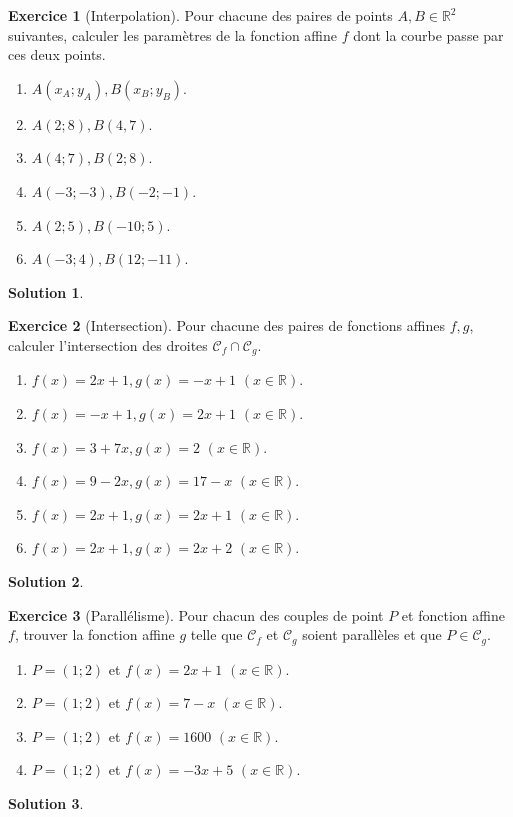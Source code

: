 \documentclass[12pt]{paper}
\theoremstyle{plain}
\newtheorem*{sol}{Solution}
\theoremstyle{definition}
\newtheorem{ex}{Exercice}
\newcommand{\C}{\mathcal{C}}
\newcommand{\R}{\mathbb{R}}
\newif\ifsolutions
\newcommand{\exe}[2]{
		\begin{ex} #1  \end{ex}
		\begin{sol} #2 \end{sol}
	}
\newcommand{\exe}[2]{
		\begin{ex} #1  \end{ex}
	}
\begin{document}
\pagestyle{fancy}
\fancyhead[C]{\textbf{Fonctions affines 2 \ifsolutions -- Solutions \fi}}
\fancyhead[R]{\today}

\exe{[Interpolation]
	Pour chacune des paires de points $A,B \in \R^2$ suivantes, calculer les paramètres de la fonction affine $f$ dont la courbe passe par ces deux points.
	
	\begin{multicols}{2}
	\begin{enumerate}
		\item $A(x_A;y_A), B(x_B; y_B)$.
		\item $A(2;8), B(4,7)$.
		\item $A(4;7), B(2;8)$.
		\item $A(-3; -3), B(-2; -1)$.
		\item $A(2;5), B(-10; 5)$.
		\item $A(-3;4), B(12;-11)$.
	\end{enumerate}
	\end{multicols}
}
{}

\exe{[Intersection]
	Pour chacune des paires de fonctions affines $f,g$, calculer l'intersection des droites $\C_f \cap \C_g$.
	
	\begin{multicols}{2}
	\begin{enumerate}
		\item $f(x) = 2x + 1, g(x) = -x+1$ $(x\in\R)$.
		\item $f(x) = -x + 1, g(x) = 2x + 1$ $(x\in\R)$.
		\item $f(x) = 3+7x, g(x) = 2$ $(x\in\R)$.
		\item $f(x) = 9-2x, g(x) = 17-x$ $(x\in\R)$.
		\item $f(x) = 2x+1, g(x) = 2x+1$ $(x\in\R)$.
		\item $f(x) = 2x+1, g(x) = 2x+2$ $(x\in\R)$.
	\end{enumerate}
	\end{multicols}
}{}

\exe{[Parallélisme]
	Pour chacun des couples de point $P$ et fonction affine $f$, trouver la fonction affine $g$ telle que $\C_f$ et $\C_g$ soient parallèles et que $P \in \C_g$.
	
	
	\begin{multicols}{2}
	\begin{enumerate}
		\item $P=(1;2)$ et $f(x) = 2x+1$ $(x\in\R)$.
		\item $P=(1;2)$ et $f(x) = 7-x$ $(x\in\R)$.
		\item $P=(1;2)$ et $f(x) = 1600$ $(x\in\R)$.
		\item $P=(1;2)$ et $f(x) = -3x + 5$ $(x\in\R)$.
	\end{enumerate}
	\end{multicols}
}{}
\end{document}
